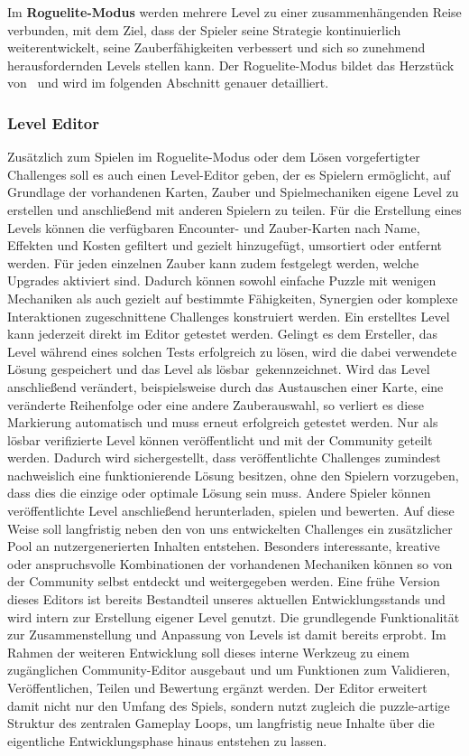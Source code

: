 Im \textbf{Roguelite-Modus} werden mehrere Level zu einer zusammenhängenden Reise verbunden, mit dem Ziel, dass der Spieler seine Strategie kontinuierlich weiterentwickelt, seine Zauberfähigkeiten verbessert und sich so zunehmend herausfordernden Levels stellen kann.
Der Roguelite-Modus bildet das Herzstück von \coc\ und wird im folgenden Abschnitt genauer detailliert.

\subsubsection{Level Editor}
Zusätzlich zum Spielen im Roguelite-Modus oder dem Lösen vorgefertigter Challenges soll es auch einen Level-Editor geben, der es Spielern ermöglicht, auf Grundlage der vorhandenen Karten, Zauber und Spielmechaniken eigene Level zu erstellen und anschließend mit anderen Spielern zu teilen.
Für die Erstellung eines Levels können die verfügbaren Encounter- und Zauber-Karten nach Name, Effekten und Kosten gefiltert und gezielt hinzugefügt, umsortiert oder entfernt werden.
Für jeden einzelnen Zauber kann zudem festgelegt werden, welche Upgrades aktiviert sind.
Dadurch können sowohl einfache Puzzle mit wenigen Mechaniken als auch gezielt auf bestimmte Fähigkeiten, Synergien oder komplexe Interaktionen zugeschnittene Challenges konstruiert werden.
Ein erstelltes Level kann jederzeit direkt im Editor getestet werden.
Gelingt es dem Ersteller, das Level während eines solchen Tests erfolgreich zu lösen, wird die dabei verwendete Lösung gespeichert und das Level als \glqq lösbar\grqq\ gekennzeichnet. Wird das Level anschließend verändert, beispielsweise durch das Austauschen einer Karte, eine veränderte Reihenfolge oder eine andere Zauberauswahl, so verliert es diese Markierung automatisch und muss erneut erfolgreich getestet werden.
Nur als lösbar verifizierte Level können veröffentlicht und mit der Community geteilt werden.
Dadurch wird sichergestellt, dass veröffentlichte Challenges zumindest nachweislich eine funktionierende Lösung besitzen, ohne den Spielern vorzugeben, dass dies die einzige oder optimale Lösung sein muss.
Andere Spieler können veröffentlichte Level anschließend herunterladen, spielen und bewerten.
Auf diese Weise soll langfristig neben den von uns entwickelten Challenges ein zusätzlicher Pool an nutzergenerierten Inhalten entstehen.
Besonders interessante, kreative oder anspruchsvolle Kombinationen der vorhandenen Mechaniken können so von der Community selbst entdeckt und weitergegeben werden.
Eine frühe Version dieses Editors ist bereits Bestandteil unseres aktuellen Entwicklungsstands und wird intern zur Erstellung eigener Level genutzt.
Die grundlegende Funktionalität zur Zusammenstellung und Anpassung von Levels ist damit bereits erprobt.
Im Rahmen der weiteren Entwicklung soll dieses interne Werkzeug zu einem zugänglichen Community-Editor ausgebaut und um Funktionen zum Validieren, Veröffentlichen, Teilen und Bewertung ergänzt werden.
Der Editor erweitert damit nicht nur den Umfang des Spiels, sondern nutzt zugleich die puzzle-artige Struktur des zentralen Gameplay Loops, um langfristig neue Inhalte über die eigentliche Entwicklungsphase hinaus entstehen zu lassen.
